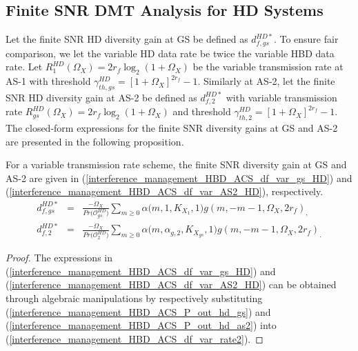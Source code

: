 \subsection{Finite SNR DMT Analysis for HD Systems}
Let the finite SNR HD diversity gain at GS be defined as $d_{f,gs}^{HD*}$. To ensure fair comparison, we let the variable HD data rate be twice the variable HBD data rate. Let $R_1^{HD}(\Omega_X)=2r_f\log_2(1+\Omega_X)$ be the variable transmission rate at AS-1 with threshold $\gamma_{th,gs}^{HD} = [1+\Omega_X]^{2r_f}-1$. Similarly at AS-2, let the finite SNR HD diversity gain at AS-2 be defined as $d_{f,2}^{HD*}$ with variable transmission rate $R_{gs}^{HD}(\Omega_X)=2r_f\log_2(1+\Omega_X)$ and threshold $\gamma_{th,2}^{HD} = [1+\Omega_X]^{2r_f}-1$. The closed-form expressions for the finite SNR diversity gains at GS and AS-2 are presented in the following proposition.

\begin{proposition}
For a variable transmission rate scheme, the finite SNR diversity gain at GS and AS-2 are given in (\ref{interference_management_HBD_ACS_df_var_gs_HD}) and (\ref{interference_management_HBD_ACS_df_var_AS2_HD}), respectively.
\begin{eqnarray} 
d_{f,gs}^{HD*} & = & \frac{-\Omega_X}{Pr\big(\mathcal{O}_{gs}^{HD}\big)} \sum_{m\geq0} \alpha\big(m,1,K_{X_1},1\big) g(m,-m-1,\Omega_X,2r_f)_, \label{interference_management_HBD_ACS_df_var_gs_HD} \\
d_{f,2}^{HD*} & = & \frac{-\Omega_X}{Pr\big(\mathcal{O}_{2}^{HD}\big)} \sum_{m\geq0} \alpha\big(m,\alpha_{g,2},K_{X_{gs}},1\big) g(m,-m-1,\Omega_X,2r_f)_. \label{interference_management_HBD_ACS_df_var_AS2_HD}
\end{eqnarray}
\end{proposition}
\begin{proof}
The expressions in (\ref{interference_management_HBD_ACS_df_var_gs_HD}) and (\ref{interference_management_HBD_ACS_df_var_AS2_HD}) can be obtained through algebraic manipulations by respectively substituting (\ref{interference_management_HBD_ACS_P_out_hd_gs}) and (\ref{interference_management_HBD_ACS_P_out_hd_as2}) into (\ref{interference_management_HBD_ACS_df_var_rate2}).
\end{proof}

